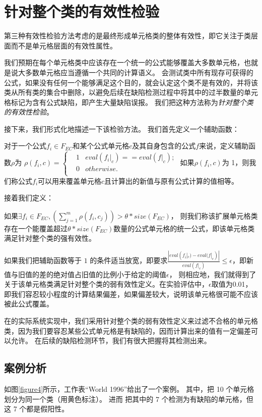 \section{针对整个类的有效性检验}
第三种有效性检验方法考虑的是最终形成单元格类的整体有效性，即它关注于类层面而不是单元格层面的有效性属性。

我们预期在每个单元格类中应该存在一个统一的公式能够覆盖大多数单元格，也就是说大多数单元格应当遵循一个共同的计算语义。
\wa 会测试类中所有现存可获得的公式，如果没有任何一个能够满足这个目的，\wa 就会认定这个类不是有效的，并将该类从所有类的集合中删除，以避免后续在缺陷检测过程中将其中的过半数量的单元格标记为含有公式缺陷，即产生大量缺陷误报。
我们把这种方法称为\textit{针对整个类的有效性检验}。

接下来，我们形式化地描述一下该检验方法。
我们首先定义一个辅助函数：
\begin{definition}
    对于一个公式$f_i \in F_{EC}$和某个公式单元格$c$及其自身包含的公式$f$来说，定义辅助函数$\rho$为
    $
    \rho(f_i, c) = 
    \left\{
        \begin{aligned}
        & 1     & eval(f_i|_c) == eval(f|_c); \\
        & 0     & otherwise. \\
        \end{aligned}
    \right.
    $
    如果$\rho(f_i,c)$为 1，则我们称公式$f_i$可以用来覆盖单元格$c$且计算出的新值与原有公式计算的值相等。
\end{definition}

接着我们定义：
\begin{definition}
    如果$\exists f_i \in F_{EC}, (\sum_{j = 1}^{m} \rho(f_i, c_j)) > \theta  * size(F_{EC})$，
    则我们称该扩展单元格类存在一个能覆盖超过$\theta  * size(F_{EC})$数量的公式单元格的统一公式，即该单元格类满足针对整个类的强有效性。
\end{definition}

如果我们把辅助函数等于 $1$ 的条件适当放宽，即要求$\frac{|eval(f_i|_c)-eval(f|_c)|}{eval(f|_c)} \leq \epsilon$，即新值与旧值的差的绝对值占旧值的比例小于给定的阈值$\epsilon$，
则相应地，我们就得到了关于该单元格类满足针对整个类的弱有效性定义。在实验评估中，$\epsilon$取值为0.01，即我们容忍较小程度的计算结果偏差，如果偏差较大，说明该单元格很可能不应该被此公式覆盖。

在\wa 的实际系统实现中，我们采用针对整个类的弱有效性定义来过滤不合格的单元格类，因为我们要容忍某些公式单元格是有缺陷的，因而计算出来的值有一定偏差可以允许。
在后续的缺陷检测环节，我们有很大把握将其检测出来。

\subsection{案例分析}

如图\ref{figure4}所示，工作表“World 1996”给出了一个案例。
其中，\cu 把 10 个单元格划分为同一个类（用黄色标注）。
进而 \cu 把其中的 7 个检测为有缺陷的单元格，但这 7 个都是假阳性。

